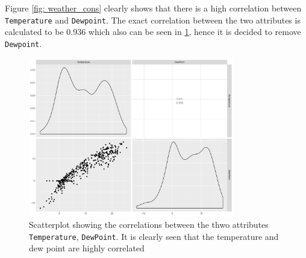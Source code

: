 \noindent Figure \ref{fig: weather_cons} clearly shows that there is a high correlation between \texttt{Temperature} and \texttt{Dewpoint}. The exact correlation between the two attributes is calculated to be 0.936 which also can be seen in \cref{fig: gg_cor}, hence it is decided to remove \texttt{Dewpoint}. 
\begin{figure}
    \centering
    \includegraphics[width=0.8\textwidth]{../../../figures/gg_cor.pdf}
    \caption{Scatterplot showing the correlations between the thwo attributes \texttt{Temperature}, \texttt{DewPoint}. It is clearly seen that the temperature and dew point are highly correlated}
    \label{fig: gg_cor}
\end{figure}
 
